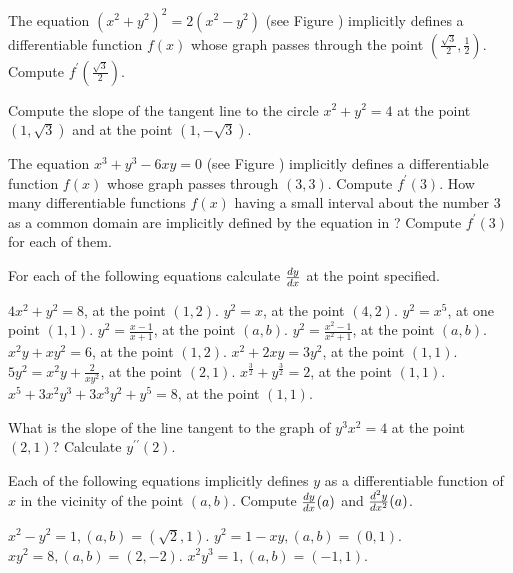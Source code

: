 \begin{exercises}

The equation $(x^2 + y^2)^2 = 2(x^2 - y^2)$ (see Figure )
implicitly defines a differentiable function $f(x)$ whose graph passes
through the point $\left( \frac{\sqrt3}{2}, \frac12\right)$.
Compute $f^\prime \left( \frac{\sqrt3}2 \right)$.

Compute the slope of the tangent line to the circle
$x^2 + y^2 = 4$ at the point $(1, \sqrt3)$ and at the point
$(1, -\sqrt3)$.

\begin{exenum}
\sx
{}
The equation $x^3 + y^3 - 6xy = 0$ (see Figure )
implicitly defines a differentiable function $f(x)$ whose graph
passes through $(3,3)$.  Compute $f^\prime (3)$.
\sx
How many differentiable functions $f(x)$ having a small
interval about the number $3$ as a common domain are
implicitly defined by the equation in ?
\sx
Compute $f^\prime (3)$ for each of them.
\end{exenum}

For each of the following equations calculate
$\frac{d y}{d x}$ at the point specified.
\begin{exenum}
\sx
$4x^2 + y^2 = 8$, at the point $(1, 2)$.
\sx
$y^2 = x$, at the point $(4, 2)$.
\sx
$y^2 = x^5$, at one point $(1,1)$.
\sx
$y^2 = \frac{x-1}{x+1}$, at the point $(a,b)$.
\sx
$y^2 = \frac{x^2-1}{x^2+1}$, at the point $(a,b)$.
\sx
$x^2y + xy^2 = 6$, at the point $(1,2)$.
\sx
$x^2 + 2xy = 3y^2$, at the point $(1,1)$.
\sx
$5y^2 = x^2y + \frac{2}{xy^2}$, at the point $(2,1)$.
\sx
$x^\frac32 + y^\frac32 = 2$, at the point $(1,1)$.
\sx
$x^5 + 3x^2y^3 + 3x^3y^2 + y^5 = 8$, at the point $(1,1)$.
\end{exenum}

What is the slope of the line tangent to the graph of
$y^3x^2 = 4$ at the point $(2,1)$?
Calculate $y^{\prime\prime} (2)$.

Each of the following equations implicitly defines $y$ as a
differentiable function of $x$ in the vicinity of the point $(a,b)$.
Compute $\frac{d y}{d x} (a)$ and $\frac{d^{2}{y}}{dx^{2}} (a)$.
\begin{exenum}
\sx
$x^2 - y^2 = 1, (a,b) = (\sqrt2, 1)$.
\sx
$y^2 = 1 -xy, (a,b) = (0,1)$.
\sx
$xy^2 = 8, (a,b) = (2, -2)$.
\sx
$x^2y^3 = 1, (a,b) = (-1,1)$.
\end{exenum}

\end{exercises}
